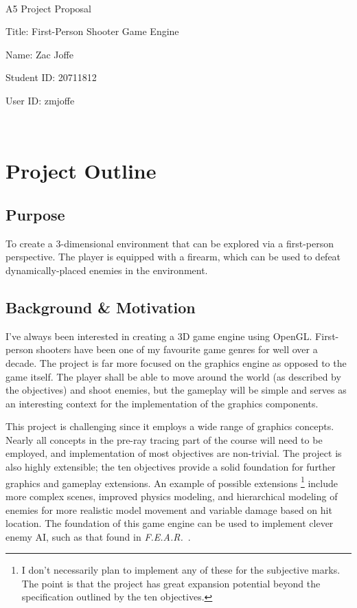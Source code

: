\documentclass {article}
\begin{document}
~\vfill
\begin{center}
\Large

A5 Project Proposal

Title: First-Person Shooter Game Engine

Name: Zac Joffe

Student ID: 20711812

User ID: zmjoffe

\end{center}
\vfill ~\vfill~
\newpage
\tableofcontents
\section{Project Outline}
\subsection{Purpose}
To create a 3-dimensional environment that can be explored via a first-person perspective. The player is equipped with a firearm, which can be used to defeat dynamically-placed enemies in the environment.

\subsection{Background \& Motivation}

I've always been interested in creating a 3D game engine using OpenGL. First-person shooters have been one of my favourite game genres for well over a decade. The project is far more focused on the graphics engine as opposed to the game itself. The player shall be able to move around the world (as described by the objectives) and shoot enemies, but the gameplay will be simple and serves as an interesting context for the implementation of the graphics components.

This project is challenging since it employs a wide range of graphics concepts. Nearly all concepts in the pre-ray tracing part of the course will need to be employed, and implementation of most objectives are non-trivial. The project is also highly extensible; the ten objectives provide a solid foundation for further graphics and gameplay extensions. An example of possible extensions \footnote{I don't necessarily plan to implement any of these for the subjective marks. The point is that the project has great expansion potential beyond the specification outlined by the ten objectives.} include more complex scenes, improved physics modeling, and hierarchical modeling of enemies for more realistic model movement and variable damage based on hit location. The foundation of this game engine can be used to implement clever enemy AI, such as that found in \textit{F.E.A.R.}~\cite{fear}.
\end{document}
